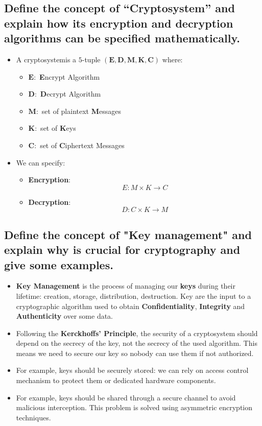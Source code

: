 \documentclass[9pt, letterpaper]{article}
\begin{document}
\subsection{Define the concept of “Cryptosystem” and explain how its encryption and decryption algorithms can be specified mathematically.}
\begin{itemize}
	\item A cryptosystemis a $5$-tuple $(\mathbf{E},\mathbf{D},\mathbf{M},\mathbf{K},\mathbf{C})$ where:
	      \begin{itemize}
		      \item $\mathbf{E}:$ \textbf{E}ncrypt Algorithm
		      \item $\mathbf{D}:$ \textbf{D}ecrypt Algorithm
		      \item $\mathbf{M}:$ set of plaintext \textbf{M}essages
		      \item $\mathbf{K}:$ set of \textbf{K}eys
		      \item $\mathbf{C}:$ set of \textbf{C}iphertext Messages
	      \end{itemize}
	\item We can specify:
	      \begin{itemize}
		      \item \textbf{Encryption}: $$E: M \times K \to C$$
		      \item \textbf{Decryption}: $$D: C \times K \to M$$
	      \end{itemize}
\end{itemize}

\subsection{Define the concept of "Key management" and explain why is crucial for cryptography and give some examples.}
\begin{itemize}
	\item \textbf{Key Management} is the process of managing our \textbf{keys} during their lifetime: creation, storage, distribution, destruction. Key are the input to a cryptographic algorithm used to obtain \textbf{Confidentiality}, \textbf{Integrity} and \textbf{Authenticity} over some data.
	\item Following the \textbf{Kerckhoffs' Principle}, the security of a cryptosystem should depend on the secrecy of the key, not the secrecy of the used algorithm. This means we need to secure our key so nobody can use them if not authorized.
	\item For example, keys should be securely stored: we can rely on access control mechanism to protect them or dedicated hardware components.
	\item For example, keys should be shared through a secure channel to avoid malicious interception. This problem is solved using asymmetric encryption techniques.
\end{itemize}
\end{document}
